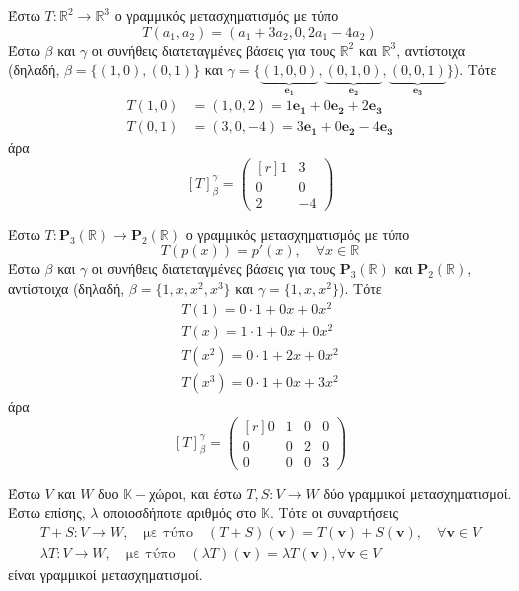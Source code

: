 \begin{example}
  Έστω $ T \colon \mathbb{R}^{2} \to \mathbb{R}^{3} $ ο γραμμικός μετασχηματισμός με 
  τύπο 
  \[
    T(a_{1}, a_{2}) = (a_{1}+3 a_{2}, 0, 2 a_{1}- 4 a_{2}) 
  \] 
  Έστω $\beta$ και $\gamma$ οι συνήθεις διατεταγμένες βάσεις για τους $ \mathbb{R}^{2} $
  και $ \mathbb{R}^{3} $, αντίστοιχα (δηλαδή, $ \beta = \{ (1,0), (0,1) \} $ και 
  $ \gamma = \{ \underbrace{(1,0,0)}_{\mathbf{e_{1}}},
  \underbrace{(0,1,0)}_{\mathbf{e_{2}}}, \underbrace{(0,0,1)}_{\mathbf{e_{3}}} \} $). 
  Τότε
  \begin{align*}
    T(1,0) &= (1,0,2) = 1 \mathbf{e_{1}} + 0 \mathbf{e_{2}}+2 \mathbf{e_{3}} \\
    T(0,1) &= (3,0,-4) = 3 \mathbf{e_{1}}+ 0 \mathbf{e_{2}}- 4 \mathbf{e_{3}}
  \end{align*}
  άρα
  \[
    [T]_{\beta}^{\gamma} = 
    \begin{pmatrix*}[r]
      1 & 3 \\
      0 & 0 \\
      2 & -4
  \end{pmatrix*} 
  \] 
\end{example}

\begin{example}
  Έστω $ T \colon \textbf{P}_{3}(\mathbb{R}) \to \textbf{P}_{2}(\mathbb{R}) $ ο 
  γραμμικός μετασχηματισμός με τύπο 
  \[
    T(p(x)) = p'(x), \quad \forall x \in \mathbb{R} 
  \]
  Έστω $ \beta $ και $\gamma$ οι συνήθεις διατεταγμένες βάσεις για τους $
  \textbf{P}_{3}(\mathbb{R}) $ και $ \textbf{P}_{2}(\mathbb{R}) $, αντίστοιχα 
  (δηλαδή, $ \beta = \{ 1,x,x^{2},x^{3} \}$ και $\gamma = \{ 1,x,x^{2} \}$). 
  Τότε
  \begin{align*}
    T(1) = 0\cdot 1 +0x +0x^{2} \\
    T(x) = 1 \cdot 1 + 0x + 0x^{2} \\
    T(x^{2}) = 0 \cdot 1 + 2x +0x^{2} \\ 
    T(x^{3}) = 0 \cdot 1 + 0x + 3x^{2}
  \end{align*}
  άρα 
  \[
    [T]_{\beta}^{\gamma} = 
    \begin{pmatrix*}[r]
      0 & 1 & 0 & 0 \\
      0 & 0 & 2 & 0 \\
      0 & 0 & 0 & 3
    \end{pmatrix*}
  \] 
\end{example}

\begin{prop}
  Έστω $V$ και $W$ δυο $ \mathbb{K}- $χώροι, και έστω $ T,S \colon V \to W $ δύο 
  γραμμικοί μετασχηματισμοί. Έστω επίσης, $\lambda$ οποιοσδήποτε αριθμός στο 
  $ \mathbb{K} $. Τότε οι συναρτήσεις
  \begin{gather*}
    T+S \colon V \to W, \quad \text{με τύπο}\quad (T+S)(\mathbf{v}) = 
    T(\mathbf{v}) + S(\mathbf{v}), \quad \forall \mathbf{v} \in V \\
    \lambda T \colon V \to W, \quad \text{με τύπο}\quad (\lambda T)(\mathbf{v}) = 
    \lambda T(\mathbf{v}), \forall \mathbf{v} \in V
  \end{gather*}
  είναι γραμμικοί μετασχηματισμοί.
\end{prop}

